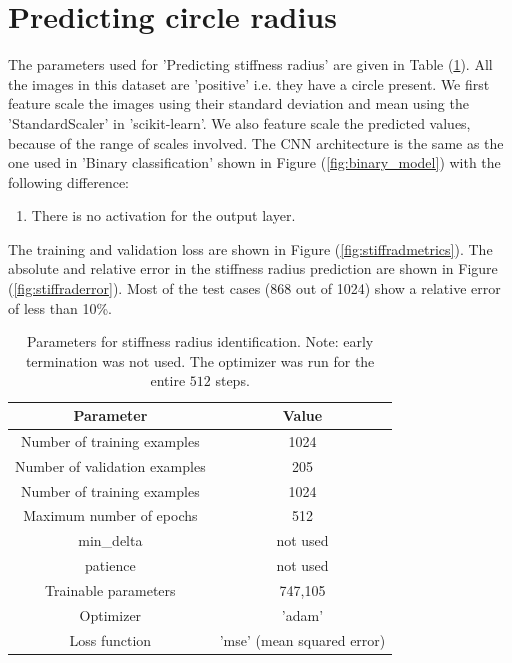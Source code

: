 \documentclass{article}
\begin{document}
\section{Predicting circle radius}
%
The parameters used for 'Predicting stiffness radius' are given in Table (\ref{tab:stiffradparam}). All the images in this dataset are 'positive' i.e. they have a circle present. We first feature scale the images using their standard deviation and mean using the 'StandardScaler' in 'scikit-learn'. We also feature scale the predicted values, because of the range of scales involved. The CNN architecture is the same as the one used in 'Binary classification' shown in Figure (\ref{fig:binary_model}) with the following difference:
%
\begin{enumerate}
\item{There is no activation for the output layer.}
\end{enumerate}
The training and validation loss are shown in Figure (\ref{fig:stiffradmetrics}). The absolute and relative error in the stiffness radius prediction are shown in Figure (\ref{fig:stiffraderror}). Most of the test cases (868 out of 1024) show a relative error of less than 10\%.
%
\begin{table}
  \centering
  \begin{tabular}{|c|c|}
    \hline
    Parameter & Value \\
    \hline
    Number of training examples   & 1024 \\
    Number of validation examples & 205 \\
    Number of training examples   & 1024 \\
    Maximum number of epochs      & 512 \\
    min{\_}delta      & not used\\
    patience                      & not used  \\
    Trainable parameters          & 747,105\\
    Optimizer         & 'adam'     \\
    Loss function     & 'mse' (mean squared error) \\
    \hline
  \end{tabular}
  \caption{\label{tab:stiffradparam} Parameters for stiffness radius identification. Note: early termination was not used. The optimizer was run for the entire $512$ steps.}
\end{table}
%
\end{document}
